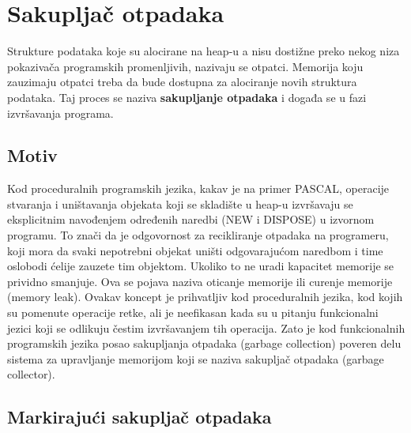 \section{Sakupljač otpadaka}
\label{sec:djubretar}


Strukture podataka koje su alocirane na heap-u a nisu dostižne preko nekog niza pokazivača programskih promenljivih, nazivaju se otpatci.
Memorija koju zauzimaju otpatci treba da bude dostupna za alociranje novih struktura podataka.
Taj proces se naziva \textbf{sakupljanje otpadaka} i događa se u fazi izvršavanja programa.

\subsection{Motiv}

Kod proceduralnih programskih jezika, kakav je na primer PASCAL,
operacije stvaranja i uništavanja objekata koji se skladište u heap-u izvršavaju se eksplicitnim navođenjem određenih naredbi (NEW i DISPOSE) u izvornom programu.
To znači da je odgovornost za recikliranje otpadaka na programeru, koji mora da svaki nepotrebni objekat uništi odgovarajućom naredbom i time oslobodi ćelije zauzete tim objektom.
Ukoliko to ne uradi kapacitet memorije se prividno smanjuje. Ova se pojava naziva oticanje memorije ili curenje memorije (memory leak). 
Ovakav koncept je prihvatljiv kod proceduralnih jezika, kod kojih su pomenute operacije retke, ali je neefikasan kada su u pitanju funkcionalni jezici koji se odlikuju čestim izvršavanjem tih operacija.
Zato je kod funkcionalnih programskih jezika posao sakupljanja otpadaka
(garbage collection) poveren delu sistema za upravljanje memorijom koji se naziva sakupljač otpadaka (garbage collector).

\subsection{Markirajući sakupljač otpadaka}

